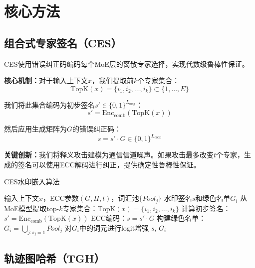 \documentclass[letterpaper,twocolumn,10pt]{article}
\begin{document}
\section{核心方法}

\subsection{组合式专家签名（CES）}

CES使用错误纠正码编码每个MoE层的离散专家选择，实现代数级鲁棒性保证。

\textbf{核心机制：}对于输入上下文$x$，我们提取前$k$个专家集合：
\begin{equation}
\text{TopK}(x) = \{i_1, i_2, \ldots, i_k\} \subset \{1, \ldots, E\}
\end{equation}

我们将此集合编码为初步签名$s' \in \{0,1\}^{L_{\text{msg}}}$：
\begin{equation}
s' = \text{Enc}_{\text{comb}}(\text{TopK}(x))
\end{equation}

然后应用生成矩阵为$G$的错误纠正码：
\begin{equation}
s = s' \cdot G \in \{0,1\}^{L_{\text{code}}}
\end{equation}

\textbf{关键创新：}我们将释义攻击建模为通信信道噪声。如果攻击最多改变$t$个专家，生成的签名可以使用ECC解码进行纠正，提供确定性鲁棒性保证。

\begin{algorithm}[h]
\caption{CES水印嵌入算法}
\begin{algorithmic}[1]
\REQUIRE 输入上下文$x$，ECC参数$(G, H, t)$，词汇池$\{Pool_j\}$
\ENSURE 水印签名$s$和绿色名单$G_i$
\STATE 从MoE模型提取top-$k$专家集合：$\text{TopK}(x) = \{i_1, i_2, \ldots, i_k\}$
\STATE 计算初步签名：$s' = \text{Enc}_{\text{comb}}(\text{TopK}(x))$
\STATE ECC编码：$s = s' \cdot G$
\STATE 构建绿色名单：$G_i = \bigcup_{j: s_j=1} Pool_j$
\STATE 对$G_i$中的词元进行logit增强
\RETURN $s$, $G_i$
\end{algorithmic}
\end{algorithm}

\subsection{轨迹图哈希（TGH）}
\end{document}
